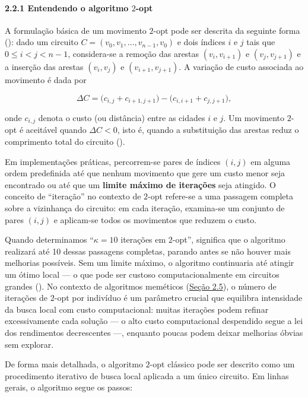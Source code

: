\paragraph{\texorpdfstring{2.2.1 Entendendo o algoritmo
\(2\)-opt}{2.2.1 Entendendo o algoritmo 2-opt}}\label{sec-221-2opt}

A formulação básica de um movimento \(2\)-opt pode ser descrita da
seguinte forma (): dado um circuito
\(C = (v_0, v_1, \dots, v_{n-1}, v_0)\) e dois índices \(i\) e \(j\)
tais que \(0 \leq i < j < n-1\), considera-se a remoção das arestas
\((v_i, v_{i+1})\) e \((v_j, v_{j+1})\) e a inserção das arestas
\((v_i, v_j)\) e \((v_{i+1}, v_{j+1})\). A variação de custo associada
ao movimento é dada por

\[
\Delta C = \bigl(c_{i,j} + c_{i+1,j+1}\bigr)
          - \bigl(c_{i,i+1} + c_{j,j+1}\bigr),
\]

onde \(c_{i,j}\) denota o custo (ou distância) entre as cidades \(i\) e
\(j\). Um movimento \(2\)-opt é aceitável quando \(\Delta C < 0\), isto
é, quando a substituição das arestas reduz o comprimento total do
circuito ().

Em implementações práticas, percorrem-se pares de índices \((i,j)\) em
alguma ordem predefinida até que nenhum movimento que gere um custo
menor seja encontrado ou até que um \textbf{limite máximo de iterações}
seja atingido. O conceito de ``iteração'' no contexto de \(2\)-opt
refere-se a uma passagem completa sobre a vizinhança do circuito: em
cada iteração, examina-se um conjunto de pares \((i,j)\) e aplicam-se
todos os movimentos que reduzem o custo.

Quando determinamos ``\(\kappa=10\) iterações em \(2\)-opt'', significa
que o algoritmo realizará até 10 dessas passagens completas, parando
antes se não houver mais melhorias possíveis. Sem um limite máximo, o
algoritmo continuaria até atingir um ótimo local --- o que pode ser
custoso computacionalmente em circuitos grandes
(). No contexto de algoritmos
meméticos (\hyperref[sec-25-algoritmos-memeticos]{Seção 2.5}), o número
de iterações de \(2\)-opt por indivíduo é um parâmetro crucial que
equilibra intensidade da busca local com custo computacional: muitas
iterações podem refinar excessivamente cada solução --- o alto custo
computacional despendido segue a lei dos rendimentos decrescentes ---,
enquanto poucas podem deixar melhorias óbvias sem explorar.

De forma mais detalhada, o algoritmo \(2\)-opt clássico pode ser
descrito como um procedimento iterativo de busca local aplicada a um
único circuito. Em linhas gerais, o algoritmo segue os passos:

